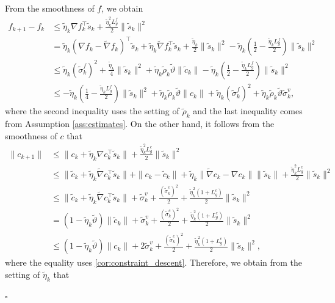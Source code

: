 \documentclass[11pt]{article}
\newenvironment{proof}{{\noindent\it Proof.}\quad}{\hfill $\square$\par}
\begin{document}
\begin{proof}
    From the smoothness of \(f\), we obtain 
    \begin{align*}
        f_{k+1} - f_k &\leq \tilde \eta_k \nabla f_k^\top \tilde s_k + \frac{\tilde \eta_k^2 L_g^f}{2}\|\tilde s_k\|^2\\
        &= \tilde \eta_k (\nabla f_k - \tilde \nabla f_k)^\top \tilde s_k + \tilde \eta_k \tilde \nabla f_k^\top \tilde s_k + \frac{\tilde \eta_k}{2}\|\tilde s_k\|^2 - \tilde \eta_k \left(\frac{1}{2}-\frac{\tilde \eta_k L_g^f}{2}\right) \|\tilde s_k\|^2 \\ 
        &\leq \tilde \eta_k(\tilde \sigma_k^f)^2 + \frac{\tilde \eta_k}{4}\|\tilde s_k\|^2 + \tilde \eta_k \tilde \rho_k \tilde \vartheta \|\tilde c_k\| - \tilde \eta_k \left(\frac{1}{2}-\frac{\tilde \eta_k L_g^f}{2}\right) \|\tilde s_k\|^2 \\
        &\leq - \tilde \eta_k \left(\frac{1}{4}-\frac{\tilde \eta_k L_g^f}{2}\right) \|\tilde s_k\|^2 + \tilde \eta_k \tilde \rho_k \tilde \vartheta \|c_k\|+ \tilde \eta_k(\tilde \sigma_k^f)^2 + \tilde \eta_k \tilde \rho_k \tilde \vartheta \tilde \sigma_k^v,
    \end{align*}
    where the second inequality uses the setting of \(\tilde \rho_k\) and the last inequality comes from Assumption \ref{ass:estimates}. On the other hand, it follows from the smoothness of $c$ that 
    \begin{align*}
        \|c_{k+1}\| &\leq \|c_k + \tilde \eta_k \nabla c_k^\top \tilde s_k\| + \frac{\tilde \eta_k^2L_g^c}{2}\|\tilde s_k\|^2\\
         &\leq \|\tilde c_k + \tilde \eta_k \tilde \nabla c_k^\top \tilde s_k\| + \|c_k - \tilde c_k\| + \tilde \eta_k \|\tilde \nabla c_k - \nabla c_k\|\|\tilde s_k\| + \frac{\tilde \eta_k^2L_g^c}{2}\|\tilde s_k\|^2\\
         &\leq \|\tilde c_k + \tilde \eta_k \tilde \nabla c_k^\top \tilde s_k\| + \tilde \sigma_k^v + \frac{(\tilde \sigma_k^c)^2}{2} + \frac{\tilde \eta_k^2(1+L_g^c)}{2}\|\tilde s_k\|^2\\
         &= (1 - \tilde \eta_k \tilde \vartheta) \|\tilde c_k\| + \tilde \sigma_k^v + \frac{(\tilde \sigma_k^c)^2}{2} + \frac{\tilde \eta_k^2(1+L_g^c)}{2}\|\tilde s_k\|^2\\
         &\leq (1 - \tilde \eta_k \tilde \vartheta) \|c_k\| + 2\tilde \sigma_k^v + \frac{(\tilde \sigma_k^c)^2}{2} + \frac{\tilde \eta_k^2(1+L_g^c)}{2}\|\tilde s_k\|^2,
    \end{align*}
    where the {equality} uses \eqref{cor:constraint_descent}. Therefore, we obtain from the setting of \(\tilde \eta_k\) that

\end{proof}
\end{document}

